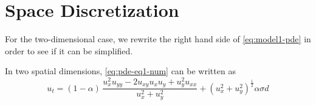 \section{Space Discretization} 
For the two-dimensional case, we rewrite the right hand side of \eqref{eq:model1-pde} in order to see if it can be simplified. 

\begin{proposition}\label{prop:simplification-equation}
In two spatial dimensions, \eqref{eq:pde-eq1-num} can be written as
\begin{equation}
    u_t = (1-\alpha)\, \frac{u_x^2 u_{yy} - 2 u_{xy} u_x u_y + u_y^2u_{xx}}{u_x^2 + u_y^2} + (u_x^2 + u_y^2)^{\frac{1}{2}}\alpha \sigma d
    \label{eq:pde-written-out}
\end{equation}
\end{proposition}

